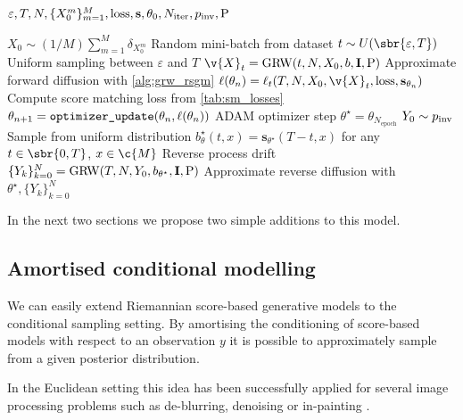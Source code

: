\begin{algorithm}[!t]
	\caption[]{}
	\label{alg:rsgm}
	\begin{algorithmic}[1]
		\small
		\Require \(\varepsilon, T, N, \{X_0^m\}_{m=1}^M, \mathrm{loss}, \mathbf{s}, \theta_0, N_{\textrm{iter}}, p_{\textup{inv}}, \mathrm{P}\)

		\State \(X_0 \sim (1/M) \sum_{m=1}^M \delta_{X_0^m}\) \Comment Random mini-batch from dataset
		\State \(t \sim U(\sbr{\varepsilon, T})\) \Comment Uniform sampling between \(\varepsilon\) and \(T\)
		\State \(\v{X}_t = \textrm{GRW}(t, N, X_0, b, \m{I}, \mathrm{P})\) \Comment Approximate forward diffusion with \cref{alg:grw_rsgm}
		\State \(\ell(\theta_n) = \ell_t(T, N, X_0, \v{X}_t, \mathrm{loss}, \mathbf{s}_{\theta_n})\) \Comment Compute score matching loss from \cref{tab:sm_losses}
		\State \(\theta_{n+1} = \verb|optimizer_update|(\theta_n, \ell(\theta_n))\) \Comment ADAM optimizer step
		\EndFor
		\State \(\theta^\star = \theta_{N_{\textrm{epoch}}}\)
		\State \(Y_0 \sim p_{\textup{inv}}\) \Comment Sample from uniform distribution
		\State \(b_\theta^\star(t, x) = \mathbf{s}_{\theta^\star}(T-t, x)\) for any \(t \in \sbr{0,T}\), \(x \in \c{M}\) \Comment Reverse process drift
		\State \(\{Y_k\}_{k=0}^{N} = \textrm{GRW}(T, N, Y_0, b_{\theta^\star}, \m{I}, \mathrm{P})\) \Comment Approximate reverse diffusion with 
		 \(\theta^\star, \{Y_k\}_{k=0}^{N}\)
	\end{algorithmic}
\end{algorithm}

In the next two sections we propose two simple additions to this model.

\subsection{Amortised conditional modelling}
\label{sec:conditional_rsgm}
We can easily extend Riemannian score-based generative models to the conditional sampling setting.
By amortising the conditioning of score-based models with respect to an observation \(y\) it is possible to approximately sample from a given posterior distribution.

In the Euclidean setting this idea has been successfully applied for several image processing problems such as de-blurring, denoising or in-painting \parencite[see for instance][]{kawar2021snips,kawar2021stochastic,lee2021priorgrad,sinha2021d2c,batzolis2021conditional,chung2021come}.

